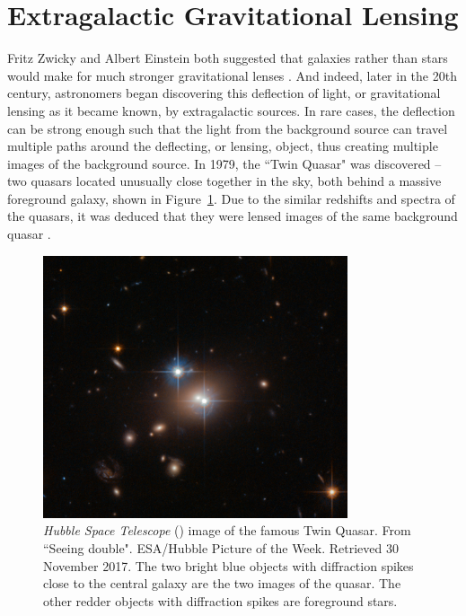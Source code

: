 
\section{Extragalactic Gravitational Lensing}

Fritz Zwicky and Albert Einstein both suggested that galaxies rather than stars would make for much stronger gravitational lenses \citep{Zwicky:1937yq,Einstein:1936cl}. And indeed, later in the 20th century, astronomers began discovering this deflection of light, or gravitational lensing as it became known, by extragalactic sources. In rare cases, the deflection can be strong enough such that the light from the background source can travel multiple paths around the deflecting, or lensing, object, thus creating multiple images of the background source. In 1979, the ``Twin Quasar" was discovered -- two quasars located unusually close together in the sky, both behind a massive foreground galaxy, shown in Figure~\ref{intro:fig:quasar}. Due to the similar redshifts and spectra of the quasars, it was deduced that they were lensed images of the same background quasar \citep{Chang:1979jk,Porcas:1979qf,Weymann:1979yu}.

\begin{figure}
\centering
\includegraphics[width=0.8\textwidth]{Intro/twin_quasar.png}
\caption[\hst\ image of the Twin Quasar]{{\it Hubble Space Telescope} (\hst) image of the famous Twin Quasar. From  ``Seeing double". ESA/Hubble Picture of the Week. Retrieved 30 November 2017. The two bright blue objects with diffraction spikes close to the central galaxy are the two images of the quasar. The other redder objects with diffraction spikes are foreground stars.}
\label{intro:fig:quasar}
\end{figure}

